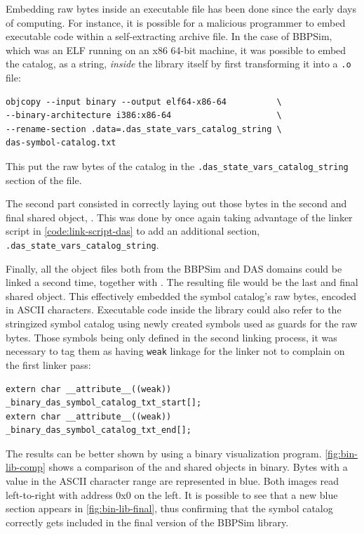 {Embedding raw bytes inside an executable file has been done since the early days of computing. For instance, it is possible for a malicious programmer to embed executable code within a self-extracting archive file\cite{online:sfx}. In the case of BBPSim, which was an ELF running on an x86 64-bit machine, it was possible to embed the catalog, as a string, \textit{inside} the library itself by first transforming it into a \texttt{.o} file:
\begin{verbatim}
objcopy --input binary --output elf64-x86-64          \
--binary-architecture i386:x86-64                     \
--rename-section .data=.das_state_vars_catalog_string \
das-symbol-catalog.txt                                
\end{verbatim}

This put the raw bytes of the catalog in the \texttt{.das_state_vars_catalog_string} section of the  file.

The second part consisted in correctly laying out those bytes in the second and final shared object, . This was done by once again taking advantage of the linker script in \autoref{code:link-script-das} to add an additional section, \texttt{.das_state_vars_catalog_string}.

Finally, all the object files both from the BBPSim and DAS domains could be linked a second time, together with . The resulting  file would be the last and final shared object. This effectively embedded the symbol catalog's raw bytes, encoded in \gls{ASCII} characters. Executable code inside the library could also refer to the stringized symbol catalog using newly created symbols used as guards for the raw bytes. Those symbols being only defined in the second linking process, it was necessary to tag them as having \texttt{weak} linkage for the linker not to complain on the first linker pass:
\begin{verbatim}
extern char __attribute__((weak)) _binary_das_symbol_catalog_txt_start[];
extern char __attribute__((weak)) _binary_das_symbol_catalog_txt_end[];
\end{verbatim}

The results can be better shown by using a binary visualization program\cite{online:binvisio}. \autoref{fig:bin-lib-comp} shows a comparison of the  and  shared objects in binary. Bytes with a value in the \gls{ASCII} character range are represented in blue. Both images read left-to-right with address 0x0 on the left. It is possible to see that a new blue section appears in \autoref{fig:bin-lib-final}, thus confirming that the symbol catalog correctly gets included in the final version of the BBPSim library.

}
